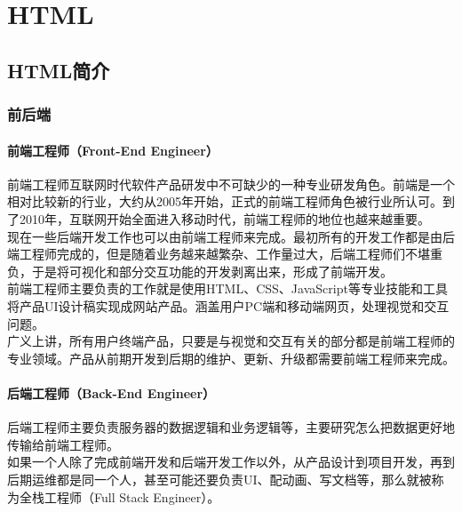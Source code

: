 \part{HTML}

\newpage

\chapter{HTML简介}

\section{前后端}

\subsection{前端工程师（Front-End Engineer）}

前端工程师互联网时代软件产品研发中不可缺少的一种专业研发角色。前端是一个相对比较新的行业，大约从2005年开始，正式的前端工程师角色被行业所认可。到了2010年，互联网开始全面进入移动时代，前端工程师的地位也越来越重要。\\

现在一些后端开发工作也可以由前端工程师来完成。最初所有的开发工作都是由后端工程师完成的，但是随着业务越来越繁杂、工作量过大，后端工程师们不堪重负，于是将可视化和部分交互功能的开发剥离出来，形成了前端开发。\\

前端工程师主要负责的工作就是使用HTML、CSS、JavaScript等专业技能和工具将产品UI设计稿实现成网站产品。涵盖用户PC端和移动端网页，处理视觉和交互问题。\\

广义上讲，所有用户终端产品，只要是与视觉和交互有关的部分都是前端工程师的专业领域。产品从前期开发到后期的维护、更新、升级都需要前端工程师来完成。\\

\subsection{后端工程师（Back-End Engineer）}

后端工程师主要负责服务器的数据逻辑和业务逻辑等，主要研究怎么把数据更好地传输给前端工程师。\\

如果一个人除了完成前端开发和后端开发工作以外，从产品设计到项目开发，再到后期运维都是同一个人，甚至可能还要负责UI、配动画、写文档等，那么就被称为全栈工程师（Full Stack Engineer）。\\

